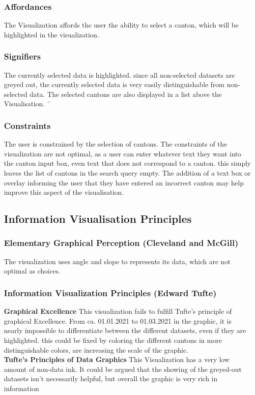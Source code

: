 \documentclass[12pt, letterpaper]{article}
\begin{document}
\subsubsection{Affordances}
The Visualization affords the user the ability to select a canton, which will be highlighted in the visualization. 
\subsubsection{Signifiers}
The currently selected data is highlighted. since all non-selected datasets are greyed out, the currently selected data is very easily distinguishable from non-selected data. The selected cantons are also displayed in a list above the Visualisation.
¨\subsubsection{Constraints}
The user is constrained by the selection of cantons. The constraints of the visualization are not optimal, as a user can enter whatever text they want into the canton input box, even text that does not correspond to a canton. this simply leaves the list of cantons in the search query empty. The addition of a text box or overlay informing the user that they have entered an incorrect canton may help improve this aspect of the visualisation.
\subsection{Information Visualisation Principles}
\subsubsection{Elementary Graphical Perception (Cleveland and McGill)}
The visualization uses angle and slope to represents its data, which are not optimal as choices. 
\subsubsection{Information Visualization Principles (Edward Tufte)}
\textbf{Graphical Excellence}
This visualization fails to fulfill Tufte's principle of graphical Excellence. From ca. 01.01.2021 to 01.03.2021 in the graphic, it is nearly impossible to differentiate between the different datasets, even if they are highlighted. this could be fixed by coloring the different cantons in more distinguishable colors, are increasing the scale of the graphic.
\\
\textbf{Tufte's Principles of Data Graphics}
This Visualization has a very low amount of non-data ink. It could be argued that the showing of the greyed-out datasets isn't necessarily helpful, but overall the graphic is very rich in information
\end{document}
